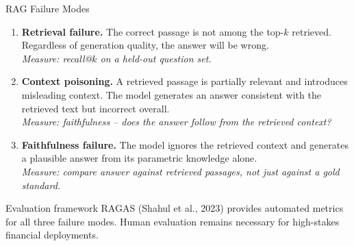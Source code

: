 \documentclass[11pt,aspectratio=169,professionalfonts]{beamer}
\begin{document}
\begin{frame}{RAG Failure Modes}
  \begin{enumerate}
    \item \textbf{Retrieval failure.}
          The correct passage is not among the top-$k$ retrieved.
          Regardless of generation quality, the answer will be wrong.\\
          \emph{Measure: recall@$k$ on a held-out question set.}

    \item \textbf{Context poisoning.}
          A retrieved passage is partially relevant and introduces
          misleading context.
          The model generates an answer consistent with the retrieved
          text but incorrect overall.\\
          \emph{Measure: faithfulness -- does the answer follow from
          the retrieved context?}

    \item \textbf{Faithfulness failure.}
          The model ignores the retrieved context and generates a
          plausible answer from its parametric knowledge alone.\\
          \emph{Measure: compare answer against retrieved passages,
          not just against a gold standard.}
  \end{enumerate}

  \begin{block}{Evaluation framework}
    RAGAS (Shahul et al., 2023) provides automated metrics for all three
    failure modes.
    Human evaluation remains necessary for high-stakes financial deployments.
  \end{block}
\end{frame}
%
\end{document}
